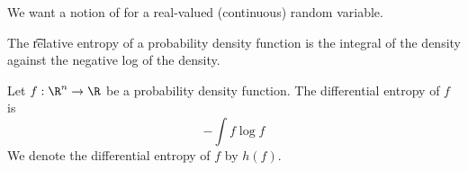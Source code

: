 

We want a notion of  for a real-valued (continuous) random variable.


The \t{relative entropy} of a probability density function is the integral of the density against the negative log of the density.


Let $f: \R^n \to \R$ be a probability density function.
The differential entropy of $f$ is
\[
  - \int f \log f
\]
We denote the differential entropy of $f$ by $h(f)$.

\blankpage
